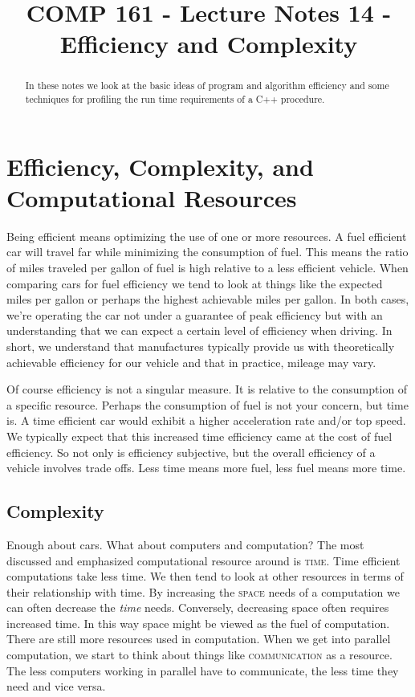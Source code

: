 \documentclass[]{tufte-handout}
\title{COMP 161 - Lecture Notes 14 - Efficiency and Complexity}
\date{}
\begin{document}
 
\maketitle

\begin{abstract}
In these notes we look at the basic ideas of program and algorithm efficiency and some techniques for profiling the run time requirements of a C++ procedure. 
\end{abstract}

\section{Efficiency, Complexity, and Computational Resources}

Being efficient means optimizing the use of one or more resources.  A fuel efficient car will travel far while minimizing the consumption of fuel. This means the ratio of miles traveled per gallon of fuel is high relative to a less efficient vehicle.  When comparing cars for fuel efficiency we tend to look at things like the expected miles per gallon or perhaps the highest achievable miles per gallon. In both cases, we're operating the car not under a guarantee of peak efficiency but with an understanding that we can expect a certain level of efficiency when driving. In short, we understand that manufactures typically provide us with theoretically achievable efficiency for our vehicle and that in practice, mileage may vary. 

Of course efficiency is not a singular measure. It is relative to the consumption of a specific resource.  Perhaps the consumption of fuel is not your concern, but time is.  A time efficient car would exhibit a higher acceleration rate and/or top speed.  We typically expect that this increased time efficiency came at the cost of fuel efficiency. So not only is efficiency subjective, but the overall efficiency of a vehicle involves trade offs.  Less time means more fuel, less fuel means more time. 

\subsection{Complexity}

Enough about cars. What about computers and computation? The most discussed and emphasized computational resource around is \textsc{time}. Time efficient computations take less time.  We then tend to look at other resources in terms of their relationship with time. By increasing the \textsc{space} needs of a computation we can often decrease the \textit{time} needs.  Conversely, decreasing space often requires increased time. In this way space might be viewed as the fuel of computation. There are still more resources used in computation. When we get into parallel computation, we start to think about things like \textsc{communication} as a resource.  The less computers working in parallel have to communicate, the less time they need and vice versa.  
\end{document}
